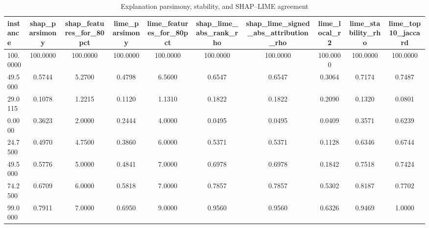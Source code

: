 \begin{table}
\centering
\caption{Explanation parsimony, stability, and SHAP--LIME agreement}
\label{tab:explanation_quality}
\begin{tabular}{lccccccccc}
\toprule
instance & shap_parsimony & shap_features_for_80pct & lime_parsimony & lime_features_for_80pct & shap_lime_abs_rank_rho & shap_lime_signed_abs_attribution_rho & lime_local_r2 & lime_stability_rho & lime_top10_jaccard \\
\midrule
100.0000 & 100.0000 & 100.0000 & 100.0000 & 100.0000 & 100.0000 & 100.0000 & 100.0000 & 100.0000 & 100.0000 \\
49.5000 & 0.5744 & 5.2700 & 0.4798 & 6.5600 & 0.6547 & 0.6547 & 0.3064 & 0.7174 & 0.7487 \\
29.0115 & 0.1078 & 1.2215 & 0.1120 & 1.1310 & 0.1822 & 0.1822 & 0.2090 & 0.1320 & 0.0801 \\
0.0000 & 0.3623 & 2.0000 & 0.2444 & 4.0000 & 0.0495 & 0.0495 & 0.0409 & 0.3571 & 0.6239 \\
24.7500 & 0.4970 & 4.7500 & 0.3860 & 6.0000 & 0.5371 & 0.5371 & 0.1128 & 0.6346 & 0.6744 \\
49.5000 & 0.5776 & 5.0000 & 0.4841 & 7.0000 & 0.6978 & 0.6978 & 0.1842 & 0.7518 & 0.7424 \\
74.2500 & 0.6709 & 6.0000 & 0.5818 & 7.0000 & 0.7857 & 0.7857 & 0.5302 & 0.8187 & 0.7702 \\
99.0000 & 0.7911 & 7.0000 & 0.6950 & 9.0000 & 0.9560 & 0.9560 & 0.6326 & 0.9469 & 1.0000 \\
\bottomrule
\end{tabular}
\end{table}
